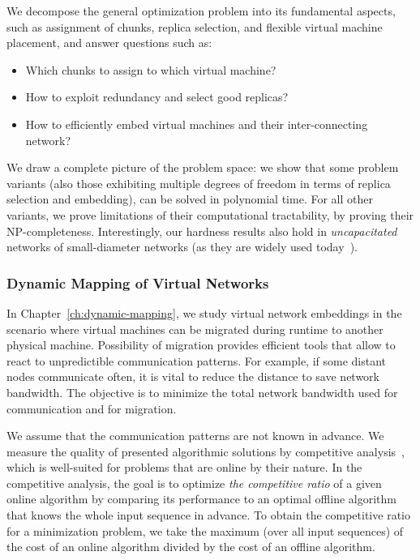 We decompose the general optimization problem into its fundamental aspects, such as
assignment of chunks, replica selection, and flexible virtual machine
placement, and answer questions such as:
\begin{itemize}
\item Which chunks to assign to which virtual machine?

\item How to exploit redundancy and select good replicas?

\item How to efficiently embed virtual machines and their inter-connecting network?

\end{itemize}

We draw a complete picture of the problem space: we show that
some problem variants (also those exhibiting multiple degrees of freedom in terms of
replica selection and embedding),
can be solved in polynomial time. For all other variants, we prove limitations of their
computational tractability, by proving their NP-completeness. Interestingly,
our hardness results also hold in \emph{uncapacitated}
networks of small-diameter networks (as they are
widely used today~\cite{fattree}).


\subsubsection{Dynamic Mapping of Virtual Networks}
\label{sec:contributions-dynamic-mapping}

In Chapter~\ref{ch:dynamic-mapping}, we study virtual network embeddings in the scenario where virtual machines can be migrated during runtime to another physical machine.
Possibility of migration provides efficient tools that allow to react to unpredictible communication patterns.
For example, if some distant nodes communicate often, it is vital to reduce the distance to save network bandwidth.
The objective is to minimize the total network bandwidth used for communication and for migration.

We assume that the communication patterns are not known in advance.
We measure the quality of presented algorithmic solutions by competitive analysis~\cite{borodin-book}, which is well-suited for problems that are online by their nature.
In the competitive analysis, the goal is to optimize \emph{the competitive ratio} of a given online algorithm by comparing its performance to an optimal offline algorithm that knows the whole input sequence in advance.
To obtain the competitive ratio for a minimization problem, we take the maximum (over all input sequences) of the cost of an online algorithm divided by the cost of an offline algorithm.

